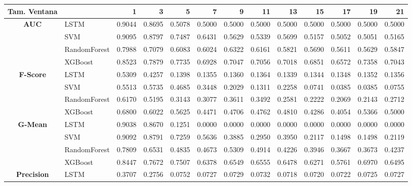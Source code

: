 \begin{table}[h]
\centering
\begin{adjustbox}{max width=15cm}
	\begin{tabular}{|c|l|r|r|r|r|r|r|r|r|r|r|r|}
		\hline
		\textbf{Tam. Ventana} &         &      1  &      3  &      5  &      7  &      9  &      11 &      13 &      15 &      17 &      19 &      21 \\
		\hline
		\textbf{AUC} & LSTM &  0.9044 &  0.8695 &  0.5078 &  0.5000 &  0.5000 &  0.5000 &  0.5000 &  0.5000 &  0.5000 &  0.5000 &  0.5000 \\
		& SVM &  0.9095 &  0.8797 &  0.7487 &  0.6431 &  0.5629 &  0.5339 &  0.5699 &  0.5157 &  0.5052 &  0.5051 &  0.5165 \\
		& RandomForest &  0.7988 &  0.7079 &  0.6083 &  0.6024 &  0.6322 &  0.6161 &  0.5821 &  0.5690 &  0.5611 &  0.5629 &  0.5847 \\
		& XGBoost &  0.8523 &  0.7879 &  0.7735 &  0.6928 &  0.7047 &  0.7056 &  0.7018 &  0.6851 &  0.6572 &  0.7358 &  0.7043 \\
		\hline
		\textbf{F-Score} & LSTM &  0.5309 &  0.4257 &  0.1398 &  0.1355 &  0.1360 &  0.1364 &  0.1339 &  0.1344 &  0.1348 &  0.1352 &  0.1356 \\
		& SVM &  0.5513 &  0.5735 &  0.4685 &  0.3448 &  0.2029 &  0.1311 &  0.2258 &  0.0741 &  0.0385 &  0.0385 &  0.0755 \\
		& RandomForest &  0.6170 &  0.5195 &  0.3143 &  0.3077 &  0.3611 &  0.3492 &  0.2581 &  0.2222 &  0.2069 &  0.2143 &  0.2712 \\
		& XGBoost &  0.6800 &  0.6022 &  0.5625 &  0.4471 &  0.4706 &  0.4762 &  0.4810 &  0.4286 &  0.4054 &  0.5366 &  0.5000 \\
		\hline
		\textbf{G-Mean} & LSTM &  0.9038 &  0.8670 &  0.1251 &  0.0000 &  0.0000 &  0.0000 &  0.0000 &  0.0000 &  0.0000 &  0.0000 &  0.0000 \\
		& SVM &  0.9092 &  0.8791 &  0.7259 &  0.5636 &  0.3885 &  0.2950 &  0.3950 &  0.2117 &  0.1498 &  0.1498 &  0.2119 \\
		& RandomForest &  0.7809 &  0.6531 &  0.4835 &  0.4673 &  0.5309 &  0.4914 &  0.4226 &  0.3946 &  0.3667 &  0.3673 &  0.4237 \\
		& XGBoost &  0.8447 &  0.7672 &  0.7507 &  0.6378 &  0.6549 &  0.6555 &  0.6478 &  0.6271 &  0.5761 &  0.6970 &  0.6495 \\
		\hline
		\textbf{Precision} & LSTM &  0.3707 &  0.2756 &  0.0752 &  0.0727 &  0.0729 &  0.0732 &  0.0718 &  0.0720 &  0.0722 &  0.0725 &  0.0727 \\

\end{tabular}
\end{adjustbox}
\end{table}
